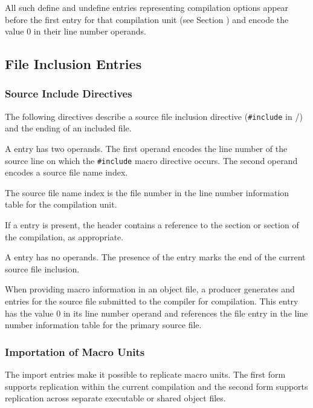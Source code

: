 All such define and undefine entries representing compilation 
options appear before the first \DWMACROstartfile{} 
entry for that compilation unit
(see Section )
and encode the value 0 in their line number operands.

\subsection{File Inclusion Entries}
\label{chap:fileinclusionentries}

\subsubsection{Source Include Directives}
\label{chap:sourceincludedirectives}

The following directives describe a source
file inclusion directive (\texttt{\#include} in
/) and the
ending of an included file.

\begin{enumerate}[1. ]

\itembfnl{\DWMACROstartfileTARG{}}
A \DWMACROstartfileNAME{} entry has two operands. The
first operand encodes the line number of the source line on
which the \texttt{\#include} macro directive occurs. 
The second operand encodes a source file name index. 

The source file name index is the file number in the 
line number information table for the compilation unit.

If a \DWMACROstartfileNAME{} entry is present, the header
contains a reference to the \dotdebugline{} section 
\bb
or \dotdebuglinedwo{} section of the compilation, as appropriate.
\eb

\itembfnl{\DWMACROendfileTARG{}}
A \DWMACROendfileNAME{} entry has no operands. The presence of
the entry marks the end of the current source file inclusion.

\end{enumerate}

When providing macro information in an object file,
a producer generates \DWMACROstartfile{} and
\DWMACROendfile{} entries for the source file submitted to
the compiler for compilation. This \DWMACROstartfile{} entry
has the value 0 in its line number operand and references
the file entry in the line number information table for the
primary source file.

\subsubsection{Importation of Macro Units}
\label{chap:importationofmacrounits}
The import entries make it possible to replicate macro units.
The first form supports replication within the current compilation
and the second form supports replication across separate 
executable or shared object files.

